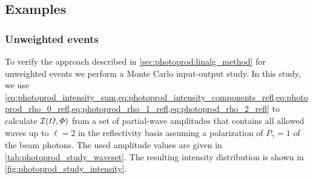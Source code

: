 \subsection{Examples}%
\label{sec:photoprod:example}

\subsubsection{Unweighted events}%
\label{sec:photoprod:example_unweighted}

To verify the approach described in \cref{sec:photoprod:linalg_method}
for unweighted events we perform a Monte Carlo input-output study.  In
this study, we use
\cref{eq:photoprod_intensity_sum,eq:photoprod_intensity_components_refl,eq:photoprod_rho_0_refl,eq:photoprod_rho_1_refl,eq:photoprod_rho_2_refl}
to calculate $\mathcal{I}(\Omega, \Phi)$ from a set of partial-wave
amplitudes that contains all allowed waves up to $\ell = 2$ in the
reflectivity basis assuming a polarization of $P_\gamma = 1$ of the
beam photons.  The used amplitude values are given in
\cref{tab:photoprod_study_waveset}.  The resulting intensity
distribution is shown in \cref{fig:photoprod_study_intensity}.

